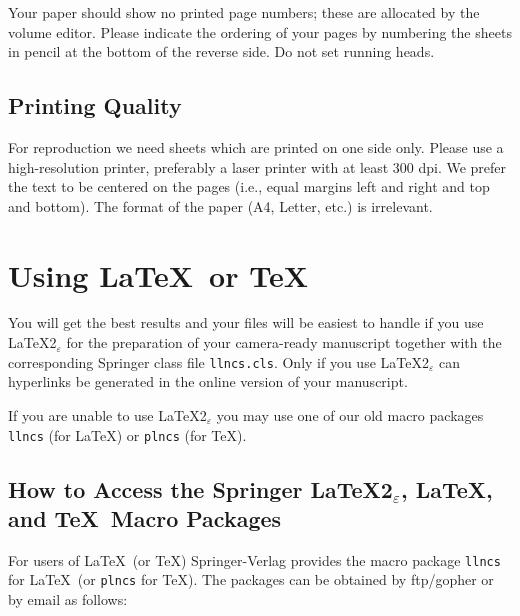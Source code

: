 \documentclass[runningheads]{llncs}
\begin{document}
Your paper should show no printed page numbers; these are allocated by
the volume editor. Please indicate the ordering of your pages by
numbering the sheets in pencil at the bottom of the
reverse side. Do not set running heads.

\subsection{Printing Quality}

For reproduction we need sheets which are printed on one side only.
Please use a high-resolution printer, preferably a laser printer
with at least 300 dpi. We prefer
the text to be centered on the pages (i.e., equal margins left and
right and top and bottom). The format of the paper (A4, Letter, etc.) is
irrelevant.


\section{Using \LaTeX\ or \TeX}
\label{sect:TeX}

You will get the best results and your files will be easiest to handle
if you use \LaTeX2$_\varepsilon$ for the preparation of your
camera-ready manuscript
together with the corresponding Springer class file
\verb+llncs.cls+. Only if you use \LaTeX2$_\varepsilon$ can
hyperlinks be generated in the online version of your manuscript.

If you are unable to use \LaTeX2$_\varepsilon$ you may use one of our
old macro packages \verb+llncs+ (for \LaTeX) or \verb+plncs+ (for \TeX).


\subsection{How to Access the Springer \LaTeX2$_\varepsilon$,
\LaTeX,\\and \TeX\ Macro Packages}

For users of \LaTeX\ (or \TeX) Springer-Verlag provides the macro
package \verb+llncs+ for \LaTeX\ (or \verb+plncs+ for \TeX). The
packages can be obtained by ftp/gopher or by email as follows:
\end{document}
